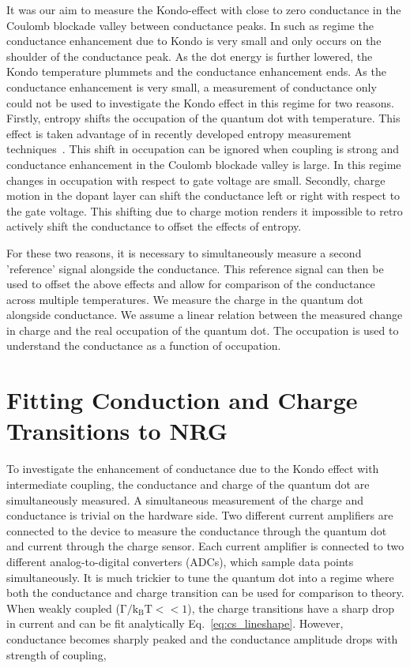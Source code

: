 It was our aim to measure the Kondo-effect with close to zero conductance in the Coulomb blockade valley between conductance peaks. In such as regime the conductance enhancement due to Kondo is very small and only occurs on the shoulder of the conductance peak. As the dot energy is further lowered, the Kondo temperature plummets and the conductance enhancement ends. As the conductance enhancement is very small, a measurement of conductance only could not be used to investigate the Kondo effect in this regime for two reasons. Firstly, entropy shifts the occupation of the quantum dot with temperature. This effect is taken advantage of in recently developed entropy measurement techniques~\cite{hartman, child_strong, child_meas}. This shift in occupation can be ignored when coupling is strong and conductance enhancement in the Coulomb blockade valley is large. In this regime changes in occupation with respect to gate voltage are small. Secondly, charge motion in the dopant layer can shift the conductance left or right with respect to the gate voltage. This shifting due to charge motion renders it impossible to retro actively shift the conductance to offset the effects of entropy. 

For these two reasons, it is necessary to simultaneously measure a second 'reference' signal alongside the conductance. This reference signal can then be used to offset the above effects and allow for comparison of the conductance across multiple temperatures. We measure the charge in the quantum dot alongside conductance. We assume a linear relation between the measured change in charge and the real occupation of the quantum dot. The occupation is used to understand the conductance as a function of occupation. 



\section{Fitting Conduction and Charge Transitions to NRG}
To investigate the enhancement of conductance due to the Kondo effect with intermediate coupling, the conductance and charge of the quantum dot are simultaneously measured. A simultaneous measurement of the charge and conductance is trivial on the hardware side. Two different current amplifiers are connected to the device to measure the conductance through the quantum dot and current through the charge sensor. Each current amplifier is connected to two different analog-to-digital converters (ADCs), which sample data points simultaneously. It is much trickier to tune the quantum dot into a regime where both the conductance and charge transition can be used for comparison to theory. When weakly coupled ($\mathrm{\Gamma/k_BT}<<1$), the charge transitions have a sharp drop in current and can be fit analytically Eq.~\ref{eq:cs_lineshape}. However, conductance becomes sharply peaked and the conductance amplitude drops with strength of coupling, 

